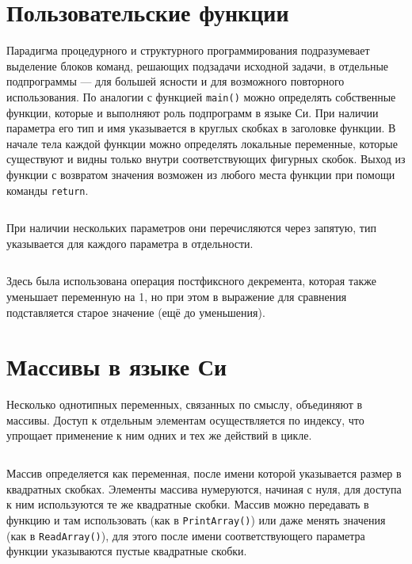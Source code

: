 \section{Пользовательские функции}

Парадигма процедурного и структурного программирования подразумевает выделение
блоков команд, решающих подзадачи исходной задачи, в отдельные подпрограммы --- для
большей ясности и для возможного повторного использования. По аналогии с
функцией \texttt{main()} можно определять собственные функции, которые и
выполняют роль подпрограмм в языке Си. При наличии параметра его тип и имя
указывается в круглых скобках в заголовке функции. В начале тела каждой
функции можно определять локальные переменные, которые существуют и видны
только внутри соответствующих фигурных скобок. Выход из функции с возвратом
значения возможен из любого места функции при помощи команды \texttt{return}.
%
\inputminted{c}{samples/factorial.c}

При наличии нескольких параметров они перечисляются через запятую, тип
указывается для каждого параметра в отдельности.
%
\inputminted{c}{samples/power.c}

Здесь была использована операция постфиксного декремента, которая также
уменьшает переменную на 1, но при этом в выражение для сравнения подставляется
старое значение (ещё до уменьшения).


\section{Массивы в языке Си}

Несколько однотипных переменных, связанных по смыслу, объединяют в массивы.
Доступ к отдельным элементам осуществляется по индексу, что упрощает
применение к ним одних и тех же действий в цикле.
%
\inputminted{c}{samples/array.c}

Массив определяется как переменная, после имени которой указывается размер в
квадратных скобках. Элементы массива нумеруются, начиная с нуля, для доступа к
ним используются те же квадратные скобки. Массив можно передавать в функцию и
там использовать (как в \verb|PrintArray()|) или даже менять значения
(как в \verb|ReadArray()|), для этого после имени соответствующего параметра
функции указываются пустые квадратные скобки.


